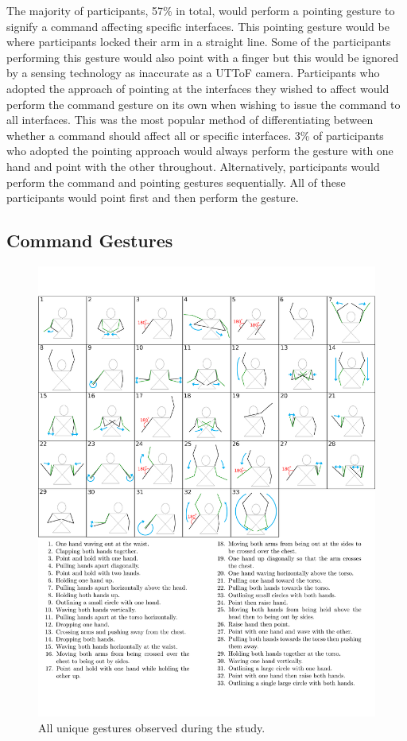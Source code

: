 \documentclass[manuscript, review, screen]{acmart}
\begin{document}
The majority of participants, 57\% in total, would perform a pointing gesture to signify a command affecting specific interfaces.
This pointing gesture would be where participants locked their arm in a straight line.
Some of the participants performing this gesture would also point with a finger but this would be ignored by a sensing technology as inaccurate as a \ac{UTToF} camera.
Participants who adopted the approach of pointing at the interfaces they wished to affect would perform the command gesture on its own when wishing to issue the command to all interfaces.
This was the most popular method of differentiating between whether a command should affect all or specific interfaces.
3\% of participants who adopted the pointing approach would always perform the gesture with one hand and point with the other throughout.
Alternatively, participants would perform the command and pointing gestures sequentially.
All of these participants would point first and then perform the gesture. 

\subsection{Command Gestures}

\begin{figure}[p]
   \centering
   \includegraphics[width=1\textwidth]{figures/all_gestures.png}
   \caption{All unique gestures observed during the study.}
   \label{fig:allGestures}
\end{figure}
\end{document}
